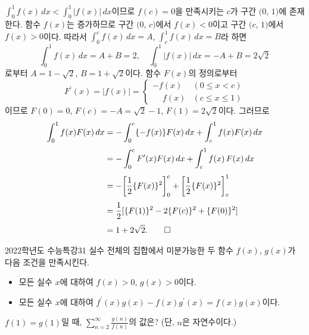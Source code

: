 \documentclass{article}
\begin{document}
\begin{sol}
	$\displaystyle\int_0^1f(x)\,dx<\int_0^1\vert f(x)\vert\,dx$이므로 $f(c)=0$을 만족시키는 $c$가 구간 $(0$, $1)$에 존재한다. 함수 $f(x)$는 증가하므로 구간 $(0$, $c)$에서 $f(x)<0$이고 구간 $(c$, $1)$에서 $f(x)>0$이다. 따라서 $\displaystyle\int_0^cf(x)\,dx=A$, $\displaystyle\int_c^1f(x)\,dx=B$라 하면
	\[
		\int_0^1f(x)\,dx=A+B=2,\quad\int_0^1\vert f(x)\vert\,dx=-A+B=2\sqrt 2
	\]
	로부터 $A=1-\sqrt2$, $B=1+\sqrt2$이다. 함수 $F(x)$의 정의로부터
	\[
		F^{\prime}(x)=\vert f(x)\vert=\begin{cases}
			-f(x) & (0\leq x<c)\\
			\phantom{-}f(x) & (c\leq x\leq 1)
		\end{cases}
	\]
	이므로 $F(0)=0$, $F(c)=-A=\sqrt2-1$, $F(1)=2\sqrt2$이다. 그러므로
	\begin{align*}
		\int_0^1f(x)F(x)\,dx&=-\int_0^c\{-f(x)\}F(x)\,dx+\int_c^1f(x)F(x)\,dx\\[3pt]
		&=-\int_0^cF^{\prime}(x)F(x)\,dx+\int_c^1f(x)\,F(x)\,dx\\[3pt]
		&=-\biggl[\frac{1}{2}\{F(x)\}^2\biggr]_0^c+\biggl[\dfrac{1}{2}\{F(x)\}^2\biggr]_c^1\\[3pt]
		&=\frac{1}{2}[\{F(1)\}^2-2\{F(c)\}^2+\{F(0)\}^2]\\[3pt]
		&=1+2\sqrt2.\qed
	\end{align*}
\end{sol}

\newpage
\begin{prob}{2022학년도 수능특강}{31}
	실수 전체의 집합에서 미분가능한 두 함수 $f(x)$, $g(x)$가 다음 조건을 만족시킨다.
	\begin{hint}
		\begin{itemize}
			\item[(가)] 모든 실수 $x$에 대하여 $f(x)>0$, $g(x)>0$이다.
			\item[(나)] 모든 실수 $x$에 대하여 $f^{\prime}(x)g(x)-f(x)g^{\prime}(x)=f(x)g(x)$이다.
		\end{itemize}
	\end{hint}
	$f(1)=g(1)$일 때, $\displaystyle\sum_{n=2}^\infty\frac{g(n)}{f(n)}$의 값은? (단, $n$은 자연수이다.)
\end{prob}
\end{document}
